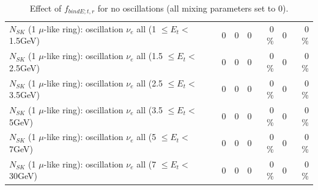 \begin{table}
\begin{tabular}{| l | r | r | r  r | r  r |}
$N_{SK}$ (1 $\mu$-like ring): oscillation $\nu_{e}$ all (1 $\leq E_{t} <$ 1.5GeV) &               0 &               0 &               0 &        0 \%  &               0 &        0 \%  \\ 
$N_{SK}$ (1 $\mu$-like ring): oscillation $\nu_{e}$ all (1.5 $\leq E_{t} <$ 2.5GeV) &               0 &               0 &               0 &        0 \%  &               0 &        0 \%  \\ 
$N_{SK}$ (1 $\mu$-like ring): oscillation $\nu_{e}$ all (2.5 $\leq E_{t} <$ 3.5GeV) &               0 &               0 &               0 &        0 \%  &               0 &        0 \%  \\ 
$N_{SK}$ (1 $\mu$-like ring): oscillation $\nu_{e}$ all (3.5 $\leq E_{t} <$ 5GeV) &               0 &               0 &               0 &        0 \%  &               0 &        0 \%  \\ 
 $N_{SK}$ (1 $\mu$-like ring): oscillation $\nu_{e}$ all (5 $\leq E_{t} <$ 7GeV) &               0 &               0 &               0 &        0 \%  &               0 &        0 \%  \\ 
$N_{SK}$ (1 $\mu$-like ring): oscillation $\nu_{e}$ all (7 $\leq E_{t} <$ 30GeV) &               0 &               0 &               0 &        0 \%  &               0 &        0 \%  \\ 
\hline
\hline
\end{tabular}
\caption{ Effect of $f_{bindE; t, r}$ for no oscillations (all mixing parameters set to 0). }
\label{tab:num_xsec_bindE_1RmuT_3f_osc_t13:0}
\end{table}
\clearpage
